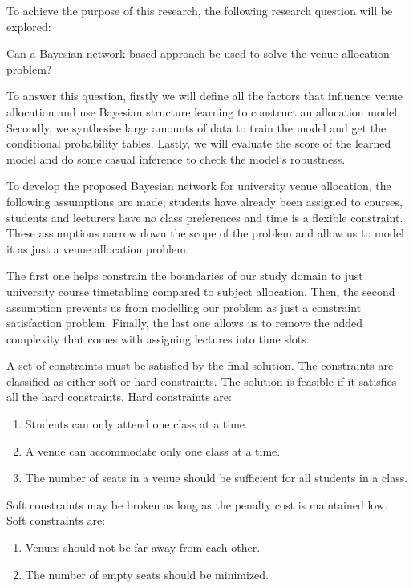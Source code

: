 \documentclass[conference]{IEEEtran}
\begin{document}
To achieve the purpose of this research, the following research question will be explored:

Can a Bayesian network-based approach be used to solve the venue allocation problem?

To answer this question, firstly we will define all the factors that influence venue allocation and use Bayesian structure learning to construct an allocation model. Secondly, we synthesise large amounts of data to train the model and get the conditional probability tables. Lastly, we will evaluate the score of the learned model and do some casual inference to check the model's robustness.

To develop the proposed Bayesian network for university venue allocation, the following assumptions are made; students have already been assigned to courses, students and lecturers have no class preferences and time is a flexible constraint. These assumptions narrow down the scope of the problem and allow us to model it as just a venue allocation problem. 

The first one helps constrain the boundaries of our study domain to just university course timetabling compared to subject allocation. Then, the second assumption prevents us from modelling our problem as just a constraint satisfaction problem. Finally, the last one allows us to remove the added complexity that comes with assigning lectures into time slots.

A set of constraints must be satisfied by the final solution. The constraints are classified as either soft or hard constraints. The solution is feasible if it satisfies all the hard constraints.
Hard constraints are:
\begin{enumerate}
    \item Students can only attend one class at a time.
    \item A venue can accommodate only one class at a time.
    \item The number of seats in a venue should be sufficient for all students in a class.
\end{enumerate}

Soft constraints may be broken as long as the penalty cost is maintained low.
Soft constraints are:
\begin{enumerate}
    \item Venues should not be far away from each other.
    \item The number of empty seats should be minimized.
\end{enumerate}
\end{document}
